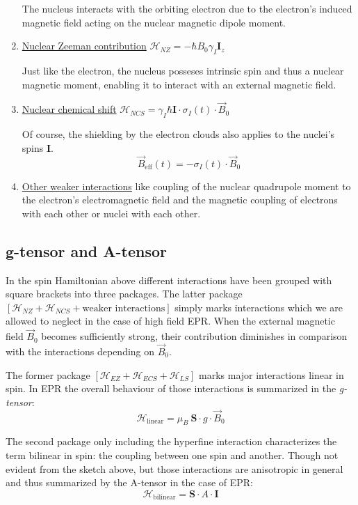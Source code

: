 \documentclass[11.5pt,a4paper]{article}
\begin{document}
\begin{enumerate}
  The nucleus interacts with the orbiting electron due to the electron's induced magnetic field acting on the nuclear magnetic dipole moment. 

  \item \uline{Nuclear Zeeman contribution} $\mathcal{H}_{NZ} = -\hbar B_0 \gamma_I \mathbf{I}_z$
  
  Just like the electron, the nucleus posseses intrinsic spin and thus a nuclear magnetic moment, enabling it to interact with an external magnetic field.

  \item \uline{Nuclear chemical shift} $\mathcal{H}_{NCS} = \gamma_I \hbar \mathbf{I} \cdot \sigma_I(t) \cdot \vec{B}_0$
  
  Of course, the shielding by the electron clouds also applies to the nuclei's spins $\mathbf{I}$.
  \begin{equation}
    \vec{B}_\text{eff}(t) = - \sigma_I(t) \cdot \vec{B}_0
  \end{equation}

  \item \uline{Other weaker interactions} like coupling of the nuclear quadrupole moment to the electron's electromagnetic field and the magnetic coupling of electrons with each other or nuclei with each other.
\end{enumerate}

\subsection{g-tensor and A-tensor}
  In the spin Hamiltonian above different interactions have been grouped with square brackets into three packages. The latter package $\left[\mathcal{H}_{NZ} + \mathcal{H}_{NCS} + \text{weaker interactions}\right]$ simply marks interactions which we are allowed to neglect in the case of high field EPR. When the external magnetic field $\vec{B}_0$ becomes sufficiently strong, their contribution diminishes in comparison with the interactions depending on $\vec{B}_0$.

  The former package $\left[\mathcal{H}_{EZ} + \mathcal{H}_{ECS} + \mathcal{H}_{LS}\right]$ marks major interactions linear in spin. In EPR the overall behaviour of those interactions is summarized in the \emph{g-tensor}:
  \begin{equation}
    \mathcal{H}_\text{linear} = \mu_B\ \mathbf{S} \cdot g \cdot \vec{B}_0
  \end{equation}

  The second package only including the hyperfine interaction characterizes the term bilinear in spin: the coupling between one spin and another. Though not evident from the sketch above, but those interactions are anisotropic in general and thus summarized by the A-tensor in the case of EPR:
  \begin{equation}
    \mathcal{H}_\text{bilinear} = \mathbf{S} \cdot A \cdot \mathbf{I}
  \end{equation}
\end{document}
